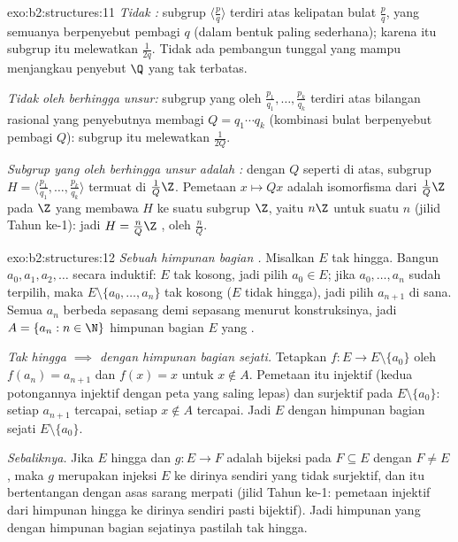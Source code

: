 \begin{solution}{exo:b2:structures:11}
\emph{Tidak :} subgrup $\langle \frac pq\rangle$ terdiri atas
kelipatan bulat $\frac pq$, yang semuanya berpenyebut pembagi $q$ (dalam
bentuk paling sederhana); karena itu subgrup itu melewatkan
$\frac{1}{2q}$. Tidak ada pembangun tunggal yang mampu menjangkau
penyebut $\Q$ yang tak terbatas.

\emph{Tidak  oleh berhingga unsur:} subgrup yang  oleh
$\frac{p_1}{q_1}, \dots, \frac{p_k}{q_k}$ terdiri atas bilangan rasional
yang penyebutnya membagi $Q = q_1 \cdots q_k$ (kombinasi bulat
berpenyebut pembagi $Q$): subgrup itu melewatkan $\frac{1}{2Q}$.

\emph{Subgrup yang  oleh berhingga unsur adalah :} dengan
$Q$ seperti di atas, subgrup $H = \langle \frac{p_1}{q_1}, \dots,
\frac{p_k}{q_k}\rangle$ termuat di $\frac{1}{Q}\Z$. Pemetaan $x
\mapsto Qx$ adalah isomorfisma dari $\frac1Q\Z$ pada $\Z$ yang membawa
$H$ ke suatu subgrup $\Z$, yaitu $n\Z$ untuk suatu $n$ (jilid Tahun
ke-1): jadi $H = \frac{n}{Q}\Z$ ,  oleh
$\frac nQ$.
\end{solution}

\begin{solution}{exo:b2:structures:12}
\emph{Sebuah himpunan bagian .} Misalkan $E$ tak hingga.
Bangun $a_0, a_1, a_2, \dots$ secara induktif: $E$ tak kosong, jadi
pilih $a_0 \in E$; jika $a_0, \dots, a_n$ sudah terpilih, maka $E
\setminus \{a_0, \dots, a_n\}$ tak kosong ($E$ tidak hingga), jadi pilih
$a_{n+1}$ di sana. Semua $a_n$ berbeda sepasang demi sepasang menurut
konstruksinya, jadi $A = \{a_n : n \in \N\}$ himpunan bagian $E$ yang .

\emph{Tak hingga $\implies$  dengan himpunan bagian sejati.}
Tetapkan $f \colon E \to E \setminus \{a_0\}$ oleh $f(a_n) = a_{n+1}$
dan $f(x) = x$ untuk $x \notin A$. Pemetaan itu injektif (kedua
potongannya injektif dengan peta yang saling lepas) dan surjektif pada
$E \setminus \{a_0\}$: setiap $a_{n+1}$ tercapai, setiap $x \notin A$
tercapai. Jadi $E$  dengan himpunan bagian sejati $E \setminus \{a_0\}$.

\emph{Sebaliknya.} Jika $E$ hingga dan $g \colon E \to F$ adalah
bijeksi pada $F \subseteq E$ dengan $F \neq E$, maka $g$ merupakan
injeksi $E$ ke dirinya sendiri yang tidak surjektif, dan itu
bertentangan dengan asas sarang merpati (jilid Tahun ke-1: pemetaan
injektif dari himpunan hingga ke dirinya sendiri pasti bijektif). Jadi
himpunan yang  dengan himpunan bagian sejatinya pastilah tak hingga.
\end{solution}


